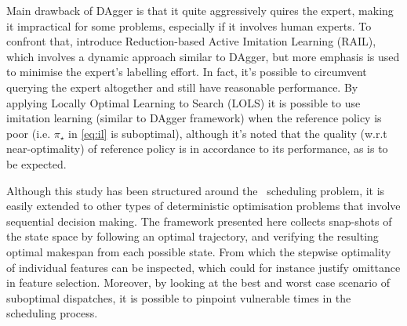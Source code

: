 \documentclass[smallextended]{svjour3}
\begin{document}
Main drawback of DAgger is that it quite aggressively quires the expert, making 
it impractical for some problems, especially if it involves human experts. 
To confront that, \cite{Judah12} introduce Reduction-based Active Imitation 
Learning (RAIL), which involves a dynamic approach similar to DAgger, but more 
emphasis is used to minimise the expert's labelling effort.
In fact, it's possible to circumvent querying the expert altogether and still 
have reasonable performance. By applying Locally Optimal Learning to Search 
(LOLS) \cite{ChangKADL15} it is possible to use imitation learning (similar to 
DAgger framework) when the reference policy is poor (i.e. $\pi_\star$ in 
\cref{eq:il} is suboptimal), 
although it's noted that the quality (w.r.t near-optimality) of reference 
policy is in accordance to its performance, as is to be expected. 

Although this study has been structured around the \jsp\ scheduling problem, 
it is easily extended to other types of deterministic optimisation problems 
that involve sequential decision making. 
The framework presented here collects snap-shots of the state space by 
following an optimal trajectory, and verifying the resulting optimal makespan 
from each possible state. 
From which the stepwise optimality of individual features can be inspected, 
which could for instance justify omittance in feature selection. 
Moreover, by looking at the best and worst case scenario of suboptimal 
dispatches, it is possible to pinpoint vulnerable times in the scheduling 
process. 

 
  
\end{document}
